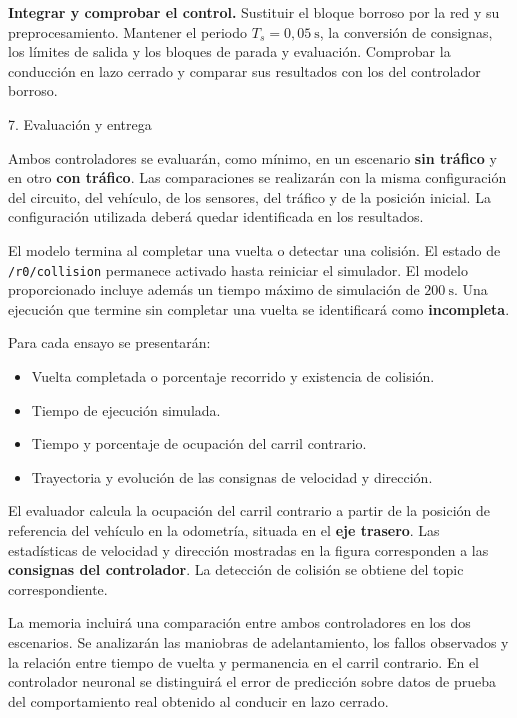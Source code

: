\documentclass[11pt,a4paper]{article}
\newcommand{\problem}[1]{%
  \par\addvspace{4.2mm}%
  {\rmfamily\fontsize{16}{18}\selectfont\color{headingblue}#1\par}%
  \nobreak\vspace{1.6mm}\nobreak
}
\newcommand{\romanitem}[2]{%
  \par\vspace{2mm}%
  \noindent\hangindent=8mm\hangafter=1%
  \makebox[8mm][r]{\textbf{#1.}\hspace{1.5mm}}#2\par
}
\begin{document}
\romanitem{v}{\textbf{Integrar y comprobar el control.}
Sustituir el bloque borroso por la red y su preprocesamiento.
Mantener el periodo $T_s=0{,}05\ \mathrm{s}$, la conversión de consignas,
los límites de salida y los bloques de parada y evaluación.
Comprobar la conducción en lazo cerrado y comparar sus resultados
con los del controlador borroso.}

\newpage
\problem{7. Evaluación y entrega}

Ambos controladores se evaluarán, como mínimo, en un escenario
\textbf{sin tráfico} y en otro \textbf{con tráfico}.
Las comparaciones se realizarán con la misma configuración del circuito,
del vehículo, de los sensores, del tráfico y de la posición inicial.
La configuración utilizada deberá quedar identificada en los resultados.

El modelo termina al completar una vuelta o detectar una colisión.
El estado de \texttt{/r0/collision} permanece activado hasta reiniciar
el simulador. El modelo proporcionado incluye además un tiempo máximo
de simulación de \textbf{$200\ \mathrm{s}$}.
Una ejecución que termine sin completar una vuelta se identificará
como \textbf{incompleta}.

Para cada ensayo se presentarán:
\begin{itemize}
  \setlength{\itemsep}{0pt}
  \item Vuelta completada o porcentaje recorrido y existencia de colisión.
  \item Tiempo de ejecución simulada.
  \item Tiempo y porcentaje de ocupación del carril contrario.
  \item Trayectoria y evolución de las consignas de velocidad y dirección.
\end{itemize}

El evaluador calcula la ocupación del carril contrario a partir de la
posición de referencia del vehículo en la odometría, situada en el
\textbf{eje trasero}. Las estadísticas de velocidad y dirección mostradas
en la figura corresponden a las \textbf{consignas del controlador}.
La detección de colisión se obtiene del topic correspondiente.

La memoria incluirá una comparación entre ambos controladores en los
dos escenarios. Se analizarán las maniobras de adelantamiento, los
fallos observados y la relación entre tiempo de vuelta y permanencia
en el carril contrario. En el controlador neuronal se distinguirá el
error de predicción sobre datos de prueba del comportamiento real
obtenido al conducir en lazo cerrado.
\end{document}
